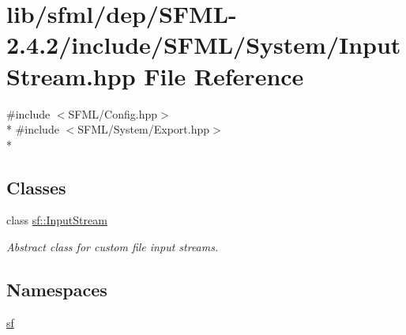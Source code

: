 \hypertarget{sfml_2dep_2_s_f_m_l-2_84_82_2include_2_s_f_m_l_2_system_2_input_stream_8hpp}{\section{lib/sfml/dep/\-S\-F\-M\-L-\/2.4.2/include/\-S\-F\-M\-L/\-System/\-Input\-Stream.hpp File Reference}
\label{sfml_2dep_2_s_f_m_l-2_84_82_2include_2_s_f_m_l_2_system_2_input_stream_8hpp}
}
{\ttfamily \#include $<$S\-F\-M\-L/\-Config.\-hpp$>$}\\*
{\ttfamily \#include $<$S\-F\-M\-L/\-System/\-Export.\-hpp$>$}\\*
\subsection*{Classes}
\begin{DoxyCompactItemize}
\item 
class \hyperlink{classsf_1_1_input_stream}{sf\-::\-Input\-Stream}
\begin{DoxyCompactList}\small\item\em Abstract class for custom file input streams. \end{DoxyCompactList}\end{DoxyCompactItemize}
\subsection*{Namespaces}
\begin{DoxyCompactItemize}
\item 
\hyperlink{namespacesf}{sf}
\end{DoxyCompactItemize}
